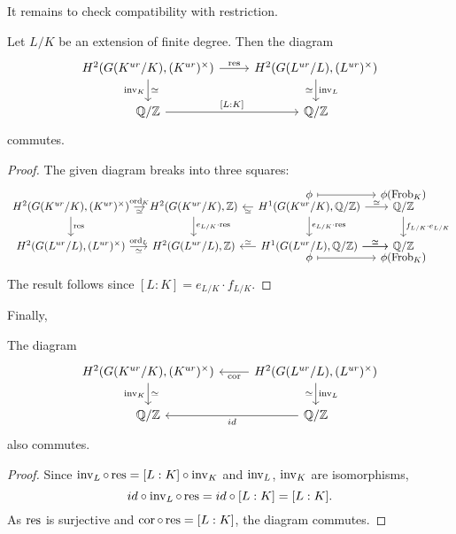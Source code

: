 \documentclass[class=article, crop=false]{standalone}
\begin{document}
It remains to check compatibility with restriction.
\begin{proposition}
	Let $L/K$ be an extension of finite degree. Then the diagram
	\[
	\begin{tikzcd}
		H^{2}(G(K^{ur}/K),(K^{ur})^{\times})\ar{r}{\res}\ar[d,"\inv_K"',"\simeq"] & H^{2}(G(L^{ur}/L),(L^{ur})^{\times})\ar[d,"\inv_L","\simeq"']\\
		\QQ/\ZZ\ar{r}{[L:K]} & \QQ/\ZZ
	\end{tikzcd}
	\] 
	commutes.
\end{proposition}
\begin{proof}
	The given diagram breaks into three squares:
	\[
	\begin{tikzcd}[column sep=1em]
		&&\phi\ar[r,mapsto] & \phi(\Frob_K)\\[-25pt]
		H^2(G(K^{ur}/K),(K^{ur})^{\times})\ar[r,"\ord_K","\simeq"']\ar[d,"\res"] & H^2(G(K^{ur}/K),\ZZ)\ar[d,"e_{L/K}\cdot\res"] & H^{1}(G(K^{ur}/K),\QQ/\ZZ)\ar[l,"\simeq"]\ar[d,"e_{L/K}\cdot\res"]\ar[r,"\simeq"]& \QQ/\ZZ\ar[d,"f_{L/K}\cdot e_{L/K}"]\\
		H^{2}(G(L^{ur}/L),(L^{ur})^{\times})\ar[r,"\ord_L","\simeq"'] & H^2(G(L^{ur}/L),\ZZ) & H^{1}(G(L^{ur}/L),\QQ/\ZZ)\ar[l,"\simeq"']\ar[r,"\simeq"]\ar[r,"\simeq"] & \QQ/\ZZ\\[-25pt]
		&&\phi\ar[r,mapsto] & \phi(\Frob_K)
	\end{tikzcd}
	\] 
	The result follows since $[L:K]=e_{L/K}\cdot f_{L/K}$.
\end{proof}
Finally,
\begin{corollary}
	The diagram
	\[
	\begin{tikzcd}
		H^{2}(G(K^{ur}/K),(K^{ur})^{\times})\ar[d,"\inv_K"',"\simeq"] & H^{2}(G(L^{ur}/L),(L^{ur})^{\times})\ar[l,"\cor"]\ar[d,"\inv_L","\simeq"']\\
		\QQ/\ZZ & \QQ/\ZZ\ar[l,"id"]
	\end{tikzcd}
	\] 
	also commutes.
\end{corollary}
\begin{proof}
	Since $\operatorname{inv}_L\circ\operatorname{res}=[L:K]\circ\operatorname{inv}_K$ and $\operatorname{inv}_L$, $\operatorname{inv}_K$ are isomorphisms,
	\[
		id\circ\operatorname{inv}_L\circ\operatorname{res}=id\circ[L:K]=[L:K]
	.\] 
	As $\operatorname{res}$ is surjective and $\operatorname{cor}\circ\operatorname{res}=[L:K]$, the diagram commutes.
\end{proof}
\end{document}
